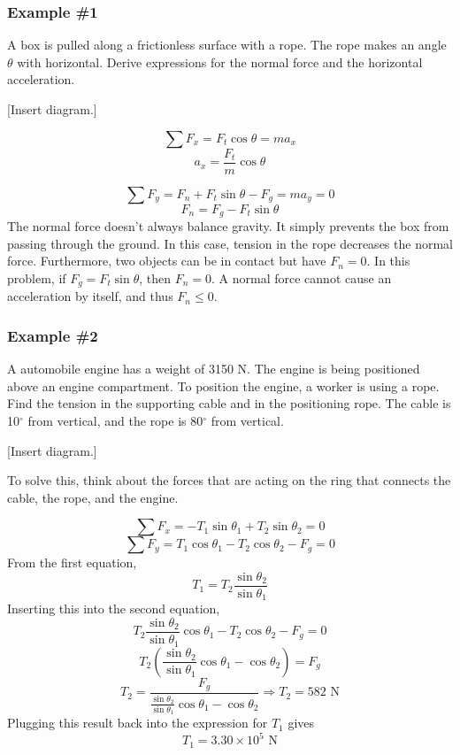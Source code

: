 \subsubsection{Example \#1}
A box is pulled along a frictionless surface with a rope. The rope makes an angle $\theta$ with horizontal. Derive expressions for the normal force and the horizontal acceleration.

[Insert diagram.]
\vspace{5cm}

$$\sum F_x=F_t\cos\theta=ma_x$$
$$\boxed{a_x=\frac{F_t}{m}\cos\theta}$$

$$\sum F_y=F_n+F_t\sin\theta-F_g=ma_y=0$$
$$\boxed{F_n=F_g-F_t\sin\theta}$$
The normal force doesn't always balance gravity. It simply prevents the box from passing through the ground. In this case, tension in the rope decreases the normal force. Furthermore, two objects can be in contact but have $F_n=0$. In this problem, if $F_g=F_t\sin\theta$, then $F_n=0$. A normal force cannot cause an acceleration by itself, and thus $F_n\leq{0}$. 

\subsubsection{Example \#2}
A automobile engine has a weight of 3150 N. The engine is being positioned above an engine compartment. To position the engine, a worker is using a rope. Find the tension in the supporting cable and in the positioning rope. The cable is 10$^\circ$ from vertical, and the rope is 80$^\circ$ from vertical.

[Insert diagram.]
\vspace{5cm}

To solve this, think about the forces that are acting on the ring that connects the cable, the rope, and the engine.

$$\sum F_x = -T_1\sin\theta_1+T_2\sin\theta_2=0$$
$$\sum F_y = T_1\cos\theta_1-T_2\cos\theta_2-F_g = 0$$
From the first equation,
$$T_1=T_2\frac{\sin\theta_2}{\sin\theta_1}$$
Inserting this into the second equation,
$$T_2\frac{\sin\theta_2}{\sin\theta_1}\cos\theta_1-T_2\cos\theta_2-F_g = 0$$
$$T_2\left(\frac{\sin\theta_2}{\sin\theta_1}\cos\theta_1-\cos\theta_2\right)=F_g$$
$$T_2=\frac{F_g}{\frac{\sin\theta_2}{\sin\theta_1}\cos\theta_1-\cos\theta_2}\Rightarrow \boxed{T_2=582\mbox{ N}}$$
Plugging this result back into the expression for $T_1$ gives
$$\boxed{T_1=3.30\times 10^5\mbox{ N}}$$




\clearpage
